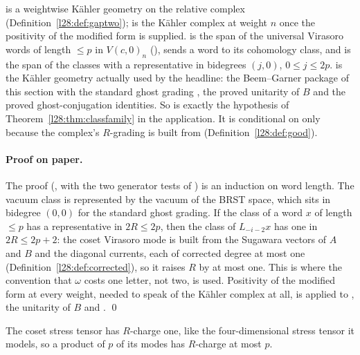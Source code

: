 \begin{dictionary}
 is a weightwise Kähler geometry on the relative complex (Definition~\ref{l28:def:gaptwo});  is
the Kähler complex at weight $n$ once the positivity  of the modified form is supplied.  is the span of the
universal Virasoro words of length $\le p$ in $V(c,0)_n$ (),  sends a
word to its cohomology class, and  is the span of the classes with a representative in bidegrees
$(j,0)$, $0\le j\le 2p$.  is the Kähler geometry actually used by the headline: the Beem--Garner package of this
section with the standard ghost grading , the proved unitarity of $B$ and the proved ghost-conjugation identities. So
 is exactly the hypothesis  of Theorem~\ref{l28:thm:classfamily} in the application. It is
conditional on  only because the complex's $R$-grading is built from  (Definition~\ref{l28:def:good}).
\end{dictionary}

\paragraph{Proof on paper.} The proof (, with the two generator tests of
) is an induction on word length. The vacuum class is represented by the vacuum of the BRST space, which
sits in bidegree $(0,0)$ for the standard ghost grading. If the class of a word $x$ of length $\le p$ has a representative in $2R\le 2p$, then
the class of $L_{-i-2}x$ has one in $2R\le 2p+2$: the coset Virasoro mode is built from the Sugawara vectors of $A$ and $B$ and the
diagonal currents, each of corrected degree at most one (Definition~\ref{l28:def:corrected}), so it raises $R$ by at most one. This is where
the convention that $\omega$ costs one letter, not two, is used. Positivity of the modified form at every weight, needed to speak of the
Kähler complex at all, is  applied to , the unitarity of $B$ and . \qed

\begin{physics}
The coset stress tensor has $R$-charge one, like the four-dimensional stress tensor it models, so a product of $p$ of its modes has
$R$-charge at most $p$.
\end{physics}


